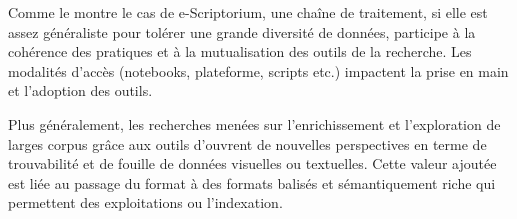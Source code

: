 Comme le montre le cas de e-Scriptorium, une chaîne de traitement, si elle est assez généraliste pour tolérer une grande diversité de données, participe à la cohérence des pratiques et à la mutualisation des outils de la recherche. Les modalités d'accès (notebooks, plateforme, scripts etc.) impactent la prise en main et l'adoption des outils. 

Plus généralement, les recherches menées sur l'enrichissement et l'exploration de larges corpus grâce aux outils d'\ia ouvrent de nouvelles perspectives en terme de trouvabilité et de fouille de données visuelles ou textuelles. Cette valeur ajoutée est liée au passage du format \jpeg à des formats balisés et sémantiquement riche qui permettent des exploitations ou l'indexation. 